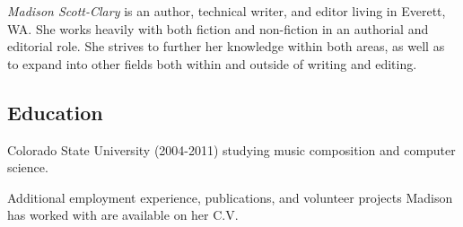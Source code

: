 \documentclass[letterpaper]{memoir}
\begin{document}


\textit{\large Madison Scott-Clary} is an author, technical writer, and editor living in Everett, WA. She works heavily with both fiction and non-fiction in an authorial and editorial role. She strives to further her knowledge within both areas, as well as to expand into other fields both within and outside of writing and editing.



\subsection{Education}\label{education}

\begin{description}
\tightlist
\item[University] \hfill
Colorado State University (2004-2011) studying music composition and
computer science.
\end{description}

Additional employment experience, publications, and volunteer projects
Madison has worked with are available on her C.V.
\end{document}
